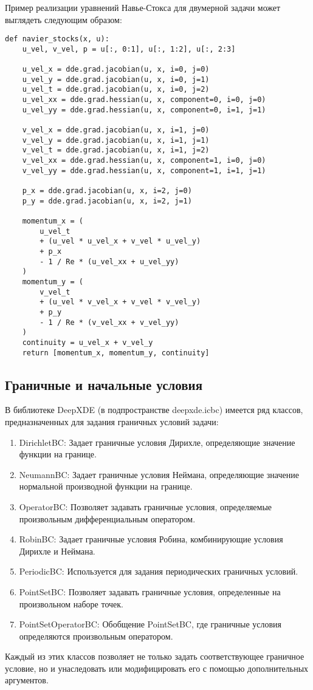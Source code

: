 Пример реализации уравнений Навье-Стокса для двумерной задачи может выглядеть следующим образом:
\begin{verbatim}
def navier_stocks(x, u):
    u_vel, v_vel, p = u[:, 0:1], u[:, 1:2], u[:, 2:3]

    u_vel_x = dde.grad.jacobian(u, x, i=0, j=0)
    u_vel_y = dde.grad.jacobian(u, x, i=0, j=1)
    u_vel_t = dde.grad.jacobian(u, x, i=0, j=2)
    u_vel_xx = dde.grad.hessian(u, x, component=0, i=0, j=0)
    u_vel_yy = dde.grad.hessian(u, x, component=0, i=1, j=1)

    v_vel_x = dde.grad.jacobian(u, x, i=1, j=0)
    v_vel_y = dde.grad.jacobian(u, x, i=1, j=1)
    v_vel_t = dde.grad.jacobian(u, x, i=1, j=2)
    v_vel_xx = dde.grad.hessian(u, x, component=1, i=0, j=0)
    v_vel_yy = dde.grad.hessian(u, x, component=1, i=1, j=1)

    p_x = dde.grad.jacobian(u, x, i=2, j=0)
    p_y = dde.grad.jacobian(u, x, i=2, j=1)

    momentum_x = (
        u_vel_t
        + (u_vel * u_vel_x + v_vel * u_vel_y)
        + p_x
        - 1 / Re * (u_vel_xx + u_vel_yy)
    )
    momentum_y = (
        v_vel_t
        + (u_vel * v_vel_x + v_vel * v_vel_y)
        + p_y
        - 1 / Re * (v_vel_xx + v_vel_yy)
    )
    continuity = u_vel_x + v_vel_y
    return [momentum_x, momentum_y, continuity]
\end{verbatim}

\subsection{Граничные и начальные условия}
В библиотеке DeepXDE (в подпространстве deepxde.icbc) имеется ряд классов, предназначенных для задания граничных условий задачи:
\begin{enumerate}
    \item DirichletBC: Задает граничные условия Дирихле, определяющие значение функции на границе.
    \item NeumannBC: Задает граничные условия Неймана, определяющие значение нормальной производной функции на границе.
    \item OperatorBC: Позволяет задавать граничные условия, определяемые произвольным дифференциальным оператором.
    \item RobinBC: Задает граничные условия Робина, комбинирующие условия Дирихле и Неймана.
    \item PeriodicBC: Используется для задания периодических граничных условий.
    \item PointSetBC: Позволяет задавать граничные условия, определенные на произвольном наборе точек.
    \item PointSetOperatorBC: Обобщение PointSetBC, где граничные условия определяются произвольным оператором.
\end{enumerate}
Каждый из этих классов позволяет не только задать соответствующее граничное условие, но и унаследовать или модифицировать
его с помощью дополнительных аргументов.

